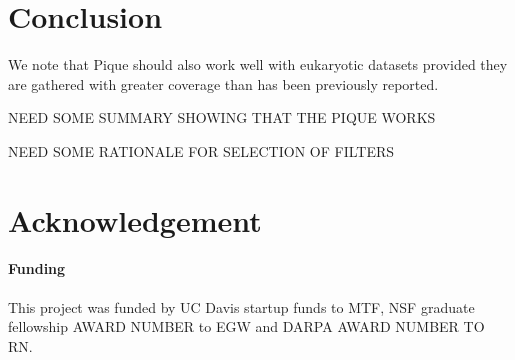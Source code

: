 \documentclass{bioinfo}
\begin{document}
\section{Conclusion}

We note that Pique should also work well with eukaryotic datasets
provided they are gathered with greater coverage than has been
previously reported.

NEED SOME SUMMARY SHOWING THAT THE PIQUE WORKS

NEED SOME RATIONALE FOR SELECTION OF FILTERS

\section*{Acknowledgement}
\paragraph{Funding\textcolon} 

This project was funded by UC Davis startup funds to MTF, NSF graduate
fellowship AWARD NUMBER to EGW and DARPA AWARD NUMBER TO RN.

%
%
%
%
%




\end{document}
